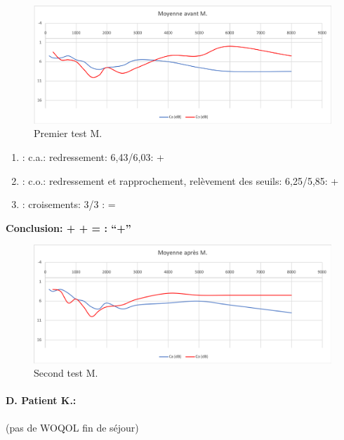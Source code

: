                 \begin{figure}
\centering
\includegraphics[width=0.7\linewidth]{images/graphiques/m_pre.png}
\caption[Moyenne OG+OD]{Premier test M.}
       
\label{groupecontroleimage1}
\end{figure}

	\begin{enumerate}
 		
 		\item : c.a.: redressement:  6,43/6,03: +
                
 		\item : c.o.: redressement et rapprochement, relèvement des seuils: 6,25/5,85:  +
 		\item : croisements: 3/3 :  =
                  
                \end{enumerate}

                \textbf{  Conclusion:  +  +  =     : ``+''}

                        \begin{figure}
\centering
\includegraphics[width=0.7\linewidth]{images/graphiques/m_post.png}
\caption[Moyenne OG+OD]{Second test M.}
       
\label{groupecontroleimage1}
\end{figure}


                
\paragraph{D. Patient K.:}

  (pas de WOQOL fin de séjour)

